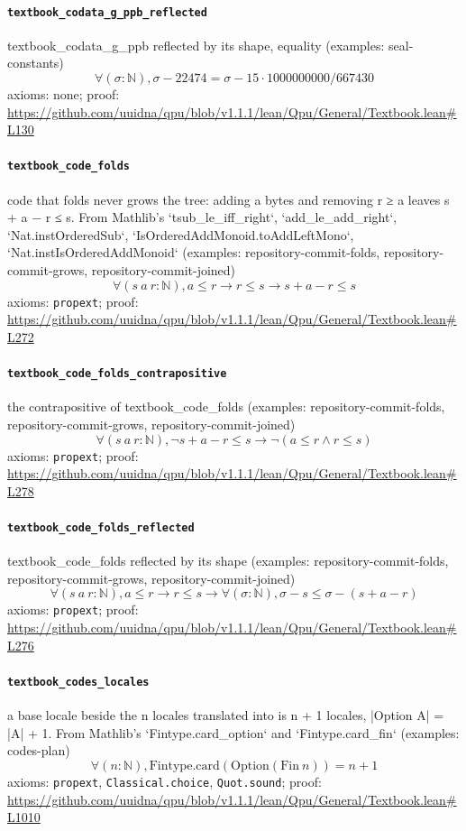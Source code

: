 \documentclass[11pt]{article}
\begin{document}
\paragraph{\texttt{textbook\_codata\_g\_ppb\_reflected}}
textbook\_codata\_g\_ppb reflected by its shape, equality (examples: seal-constants)
\[ \forall (\sigma : \mathbb{N}), \sigma - 22474 = \sigma - 15 \cdot 1000000000 / 667430 \]
\noindent axioms: none; proof: \url{https://github.com/uuidna/qpu/blob/v1.1.1/lean/Qpu/General/Textbook.lean\#L130}

\paragraph{\texttt{textbook\_code\_folds}}
code that folds never grows the tree: adding a bytes and removing r ≥ a leaves s + a − r ≤ s. From Mathlib's `tsub\_le\_iff\_right`, `add\_le\_add\_right`, `Nat.instOrderedSub`, `IsOrderedAddMonoid.toAddLeftMono`, `Nat.instIsOrderedAddMonoid` (examples: repository-commit-folds, repository-commit-grows, repository-commit-joined)
\[ \forall (s\ a\ r : \mathbb{N}), a \le r \to r \le s \to s + a - r \le s \]
\noindent axioms: \texttt{propext}; proof: \url{https://github.com/uuidna/qpu/blob/v1.1.1/lean/Qpu/General/Textbook.lean\#L272}

\paragraph{\texttt{textbook\_code\_folds\_contrapositive}}
the contrapositive of textbook\_code\_folds (examples: repository-commit-folds, repository-commit-grows, repository-commit-joined)
\[ \forall (s\ a\ r : \mathbb{N}), \neg s + a - r \le s \to \neg (a \le r \land r \le s) \]
\noindent axioms: \texttt{propext}; proof: \url{https://github.com/uuidna/qpu/blob/v1.1.1/lean/Qpu/General/Textbook.lean\#L278}

\paragraph{\texttt{textbook\_code\_folds\_reflected}}
textbook\_code\_folds reflected by its shape (examples: repository-commit-folds, repository-commit-grows, repository-commit-joined)
\[ \forall (s\ a\ r : \mathbb{N}), a \le r \to r \le s \to \forall (\sigma : \mathbb{N}), \sigma - s \le \sigma - (s + a - r) \]
\noindent axioms: \texttt{propext}; proof: \url{https://github.com/uuidna/qpu/blob/v1.1.1/lean/Qpu/General/Textbook.lean\#L276}

\paragraph{\texttt{textbook\_codes\_locales}}
a base locale beside the n locales translated into is n + 1 locales, |Option A| = |A| + 1. From Mathlib's `Fintype.card\_option` and `Fintype.card\_fin` (examples: codes-plan)
\[ \forall (n : \mathbb{N}), \mathrm{Fintype.card} (\mathrm{Option} (\mathrm{Fin}\ n)) = n + 1 \]
\noindent axioms: \texttt{propext}, \texttt{Classical.choice}, \texttt{Quot.sound}; proof: \url{https://github.com/uuidna/qpu/blob/v1.1.1/lean/Qpu/General/Textbook.lean\#L1010}
\end{document}
